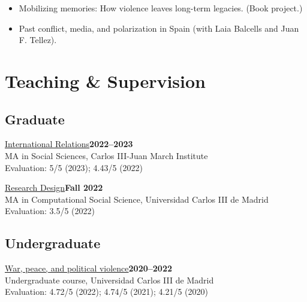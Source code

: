 \documentclass[a4paper, 12pt]{article}
\begin{document}
\begin{itemize}[leftmargin=*, nolistsep]
\item Mobilizing memories: How violence leaves long-term legacies. (Book project.)
\item Past conflict, media, and polarization in Spain (with Laia Balcells and Juan F. Tellez).
\end{itemize}

\section*{Teaching \& Supervision}


\subsection*{Graduate}

\noindent
\href{https://raw.githack.com/franvillamil/syllabi/master/current/syllabus_IR.pdf}{International Relations}\hfill\textbf{2022--2023}\\
{\small MA in Social Sciences, Carlos III-Juan March Institute}\\
{\small Evaluation: 5/5 (2023); 4.43/5 (2022)}
\vspace{10pt}

\noindent
\href{https://github.com/franvillamil/syllabi/blob/master/current/syllabus_research_design.pdf}{Research Design}\hfill\textbf{Fall 2022}\\
{\small MA in Computational Social Science, Universidad Carlos III de Madrid}\\
{\small Evaluation: 3.5/5 (2022)}

\vspace{-10pt}
\subsection*{Undergraduate}

\noindent
\href{https://github.com/franvillamil/syllabi/blob/master/current/syllabus_war_peace_political_violence.pdf}{War, peace, and political violence}\hfill\textbf{2020--2022}\\
{\small Undergraduate course, Universidad Carlos III de Madrid}\\
{\small Evaluation: 4.72/5 (2022); 4.74/5 (2021); 4.21/5 (2020)}
\vspace{10pt}
\end{document}
